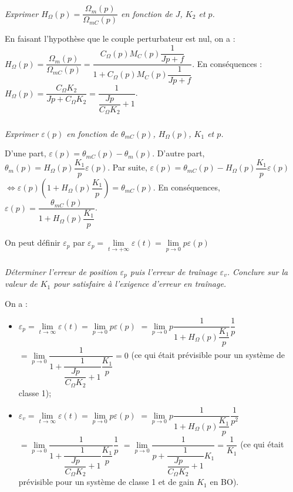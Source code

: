 \documentclass[10pt,fleqn]{article} %
\begin{document}
\begin{multicols}{2}
\else
\fi


\subparagraph{}\textit{Exprimer $H_{\Omega}(p)=\dfrac{\Omega_m(p)}{\Omega_{mC}(p)}$
en fonction de $J$, $K_2$ et $p$.}
\ifprof
\begin{corrige}
En faisant l'hypothèse que le couple perturbateur est nul, on a :
$H_{\Omega}(p)=\dfrac{\Omega_m(p)}{\Omega_{mC}(p)}=\dfrac{C_{\Omega}(p)M_C(p)\dfrac{1}{Jp+f}}{1+C_{\Omega}(p)M_C(p)\dfrac{1}{Jp+f}}$. En conséquences : 
$H_{\Omega}(p)=\dfrac{C_{\Omega} K_2}{Jp+C_{\Omega} K_2 } = \dfrac{1}{\dfrac{Jp}{C_{\Omega} K_2}+1 } $.

\end{corrige}
\else
\fi

\subparagraph{}\textit{Exprimer $\varepsilon(p)$ en fonction de $\theta_{mC}(p)$, $H_{\Omega}(p)$, $K_1$ et $p$.}
\ifprof

\begin{corrige}
D'une part, $\varepsilon(p)=\theta_{mC}(p)-\theta_{m}(p)$. D'autre part, 
$\theta_{m}(p) =H_{\Omega}(p) \dfrac{K_1}{p} \varepsilon(p)$. Par suite, 
$\varepsilon(p)=\theta_{mC}(p)-H_{\Omega}(p) \dfrac{K_1}{p}\varepsilon(p) $ 
$\Leftrightarrow \varepsilon(p)\left( 1+H_{\Omega}(p) \dfrac{K_1}{p}\right)= \theta_{mC}(p)$. 
En conséquences, $\varepsilon(p)=\dfrac{ \theta_{mC}(p)}{ 1+H_{\Omega}(p) \dfrac{K_1}{p}}$.
\end{corrige}
\else
\fi

\ifprof
\else
\begin{methode} On peut définir $\varepsilon_p$ par $\varepsilon_p=\lim\limits_{t \to +\infty} \varepsilon(t)=\lim\limits_{p \to 0} p\varepsilon(p)$
\end{methode}
\fi

\subparagraph{}\textit{Déterminer l’erreur de position $\varepsilon_p$ puis l’erreur de traînage $\varepsilon_v$. Conclure sur la valeur de $K_1$ pour satisfaire
à l’exigence d’erreur en traînage.}

\ifprof
\begin{corrige}
On a :
\begin{itemize}
\item $\varepsilon_p = \lim\limits_{t\to \infty} \varepsilon(t)= \lim\limits_{p\to 0} p\varepsilon(p) $ $= \lim\limits_{p\to 0} p \dfrac{ 1}{ 1+H_{\Omega}(p) \dfrac{K_1}{p}} \dfrac {1}{p}$
$= \lim\limits_{p\to 0} \dfrac{ 1}{ 1+\dfrac{1}{\dfrac{Jp}{C_{\Omega} K_2}+1 } \dfrac{K_1}{p}} = 0$ (ce qui était prévisible pour un système de classe 1);
\item $\varepsilon_v = \lim\limits_{t\to \infty} \varepsilon(t)= \lim\limits_{p\to 0} p\varepsilon(p) $ $= \lim\limits_{p\to 0} p \dfrac{ 1}{ 1+H_{\Omega}(p) \dfrac{K_1}{p}} \dfrac {1}{p^2}$
$= \lim\limits_{p\to 0} \dfrac{ 1}{ 1+\dfrac{1}{\dfrac{Jp}{C_{\Omega} K_2}+1 } \dfrac{K_1}{p}}\dfrac {1}{p} $
$= \lim\limits_{p\to 0} \dfrac{ 1}{ p+\dfrac{1}{\dfrac{Jp}{C_{\Omega} K_2}+1 } K_1}= \dfrac{1}{K_1}$ (ce qui était prévisible pour un système de classe 1 et de gain $K_1$ en BO).
\end{itemize}


\end{corrige}
\end{multicols}
\end{document}
